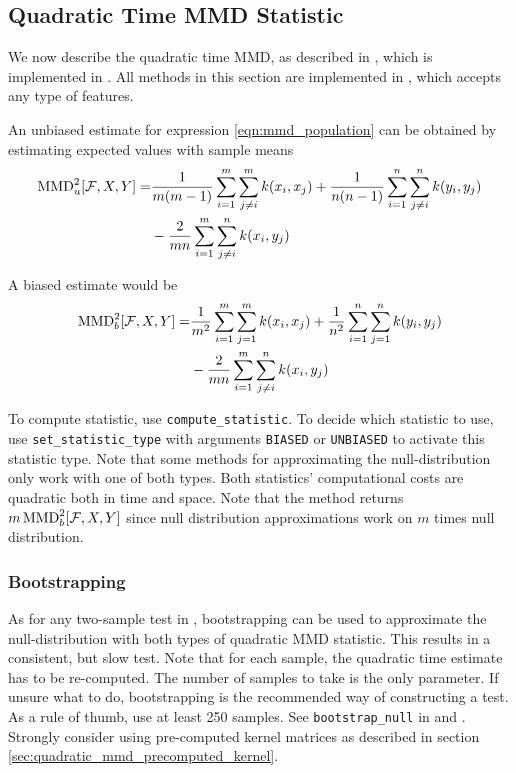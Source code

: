 \subsection{Quadratic Time MMD Statistic}
\label{sec:mmd_quadratic}
We now describe the quadratic time MMD, as described in \citep[Lemma
6]{Gretton2012}, which is implemented in \shogun{}. All methods in this section are implemented in , which accepts any type of \shogun{} features.

An unbiased estimate for expression \ref{eqn:mmd_population} can be obtained by estimating expected values with sample means
\begin{align*}
\operatorname{MMD}_u^2[\mathcal{F},X,Y]=&\frac{1}{m(m-1)}\sum_{i=1}^m\sum_{j\neq i}^mk(x_i,x_j) + \frac{1}{n(n-1)}\sum_{i=1}^n\sum_{j\neq i}^nk(y_i,y_j)\\
&-\frac{2}{mn}\sum_{i=1}^m\sum_{j\neq i}^nk(x_i,y_j)
\end{align*}

A biased estimate would be
\begin{align*}
\operatorname{MMD}_b^2[\mathcal{F},X,Y]=&\frac{1}{m^2}\sum_{i=1}^m\sum_{j=1}^mk(x_i,x_j) + \frac{1}{n^ 2}\sum_{i=1}^n\sum_{j=1}^nk(y_i,y_j)\\
&-\frac{2}{mn}\sum_{i=1}^m\sum_{j\neq i}^nk(x_i,y_j)
\end{align*}

To compute statistic, use \texttt{compute\_statistic}. To decide which statistic to use, use \texttt{set\_statistic\_type} with arguments \texttt{BIASED} or \texttt{UNBIASED} to activate this statistic type. Note that some methods for approximating the null-distribution only work with one of both types. Both statistics' computational costs are quadratic both in time and space. Note that the method returns $m\operatorname{MMD}_b^2[\mathcal{F},X,Y]$ since null distribution approximations work on $m$ times null distribution.

\subsubsection{Bootstrapping}
As for any two-sample test in \shogun{}, bootstrapping can be used to approximate the null-distribution with both types of quadratic MMD statistic. This results in a consistent, but slow test. Note that for each sample, the quadratic time estimate has to be re-computed. The number of samples to take is the only parameter. If unsure what to do, bootstrapping is the recommended way of constructing a test. As a rule of thumb, use at least 250 samples.
See \texttt{bootstrap\_null} in  and . Strongly consider using pre-computed kernel matrices as described in section \ref{sec:quadratic_mmd_precomputed_kernel}.

